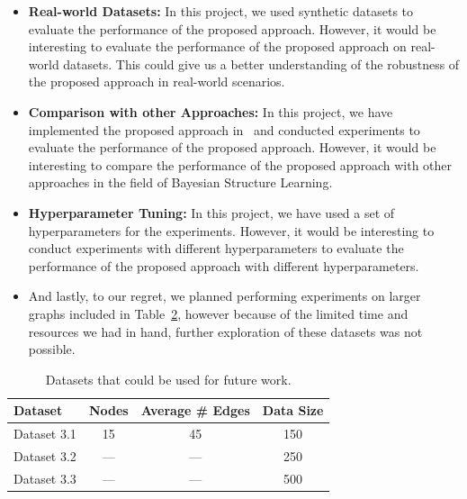 \documentclass{lxaiproposal}
\begin{document}
\begin{table}[h]
        \begin{itemize}
            \item \textbf{Real-world Datasets:} In this project, we used synthetic datasets to evaluate the performance of
            the proposed approach. However, it would be interesting to evaluate the performance of the proposed approach
            on real-world datasets. This could give us a better understanding of the robustness of the proposed approach
            in real-world scenarios.
            \item \textbf{Comparison with other Approaches:} In this project, we have implemented the proposed approach
            in~\cite{deleu2022daggflownet} and conducted experiments to evaluate the performance of the proposed approach.
            However, it would be interesting to compare the performance of the proposed approach with other approaches in
            the field of Bayesian Structure Learning.
            \item \textbf{Hyperparameter Tuning:} In this project, we have used a set of hyperparameters for the
            experiments. However, it would be interesting to conduct experiments with different hyperparameters to
            evaluate the performance of the proposed approach with different hyperparameters.
            \item And lastly, to our regret, we planned performing experiments on larger graphs included in
            Table~\ref{tab:future_dataset}, however because of the limited time and resources we had in hand,
            further exploration of these datasets was not possible.
        \end{itemize}

        \begin{table}[h]
            \centering
            \begin{tabular}{|l|c|c|c|}
                \hline
                \textbf{Dataset} & \textbf{Nodes} & \textbf{Average \# Edges} & \textbf{Data Size} \\
                \hline
                Dataset 3.1      & 15             & 45                        & 150                \\
                Dataset 3.2      & ---            & ---                       & 250                \\
                Dataset 3.3      & ---            & ---                       & 500                \\
                \hline
            \end{tabular}
            \caption{Datasets that could be used for future work.}
            \label{tab:future_dataset}
        \end{table}



\end{table}
\end{document}
